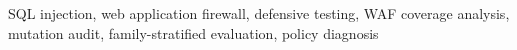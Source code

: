 \begin{IEEEkeywords}
SQL injection, web application firewall, defensive testing, WAF coverage analysis, mutation audit, family-stratified evaluation, policy diagnosis
\end{IEEEkeywords}
